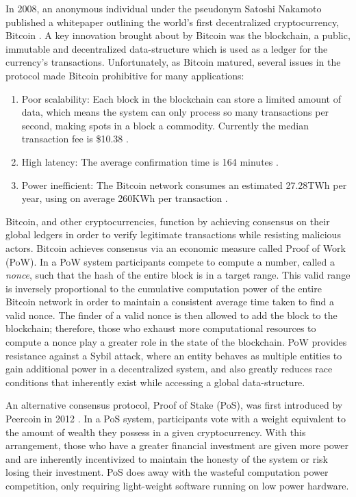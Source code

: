 In 2008, an anonymous individual under the pseudonym Satoshi Nakamoto published a whitepaper outlining the world's first decentralized cryptocurrency, Bitcoin \cite{Nakamoto_bitcoin:a}. A key innovation brought about by Bitcoin was the blockchain, a public, immutable and decentralized data-structure which is used as a ledger for the currency's transactions. Unfortunately, as Bitcoin matured, several issues in the protocol made Bitcoin prohibitive for many applications:
\begin{enumerate}
  \item Poor scalability: Each block in the blockchain can store a limited amount of data, which means the system can only process so many transactions per second, making spots in a block a commodity. Currently the median transaction fee is \$10.38 \cite{Bitcoin_med_fee}.
  \item High latency: The average confirmation time is 164 minutes \cite{Bitcoin_avg_confirmation_time}.
  \item Power inefficient: The Bitcoin network consumes an estimated 27.28TWh per year, using on average 260KWh per transaction \cite{Bitcoin_energy_index}.
\end{enumerate}

Bitcoin, and other cryptocurrencies, function by achieving consensus on their global ledgers in order to verify legitimate transactions while resisting malicious actors. Bitcoin achieves consensus via an economic measure called Proof of Work (PoW). In a PoW system participants compete to compute a number, called a \textit{nonce}, such that the hash of the entire block is in a target range. This valid range is inversely proportional to the cumulative computation power of the entire Bitcoin network in order to maintain a consistent average time taken to find a valid nonce. The finder of a valid nonce is then allowed to add the block to the blockchain; therefore, those who exhaust more computational resources to compute a nonce play a greater role in the state of the blockchain. PoW provides resistance against a Sybil attack, where an entity behaves as multiple entities to gain additional power in a decentralized system, and also greatly reduces race conditions that inherently exist while accessing a global data-structure.

An alternative consensus protocol, Proof of Stake (PoS), was first introduced by Peercoin in 2012 \cite{King_peercoin}. In a PoS system, participants vote with a weight equivalent to the amount of wealth they possess in a given cryptocurrency. With this arrangement, those who have a greater financial investment are given more power and are inherently incentivized to maintain the honesty of the system or risk losing their investment. PoS does away with the wasteful computation power competition, only requiring light-weight software running on low power hardware.

